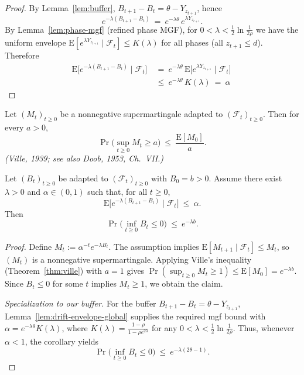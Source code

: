 \documentclass[lettersize,journal]{IEEEtran}
\newcommand{\EE}{\text{E}}
\begin{document}
\begin{proof}
	By Lemma~\ref{lem:buffer}, $B_{t+1}-B_t=\theta-Y_{z_{t+1}}$, hence
	\[
	e^{-\lambda(B_{t+1}-B_t)}\ =\ e^{-\lambda\theta}\,e^{\lambda Y_{z_{t+1}}}.
	\]
	By Lemma~\ref{lem:phase-mgf} (refined phase MGF), for $0<\lambda<\tfrac12\ln\!\tfrac{1}{2\rho}$ we have the uniform envelope
	$\EE[e^{\lambda Y_{z_{t+1}}}\mid\mathcal F_t]\le K(\lambda)$ for all phases (all $z_{t+1}\le d$). Therefore
	\begin{align*}
	\EE\!\big[e^{-\lambda(B_{t+1}-B_t)}\mid \mathcal F_t\big]
	\ &=\ e^{-\lambda\theta}\,\EE\!\big[e^{\lambda Y_{z_{t+1}}}\mid\mathcal F_t\big]
	\ \\ &\le\ e^{-\lambda\theta}\,K(\lambda)
	\ =\ \alpha	
	\end{align*}
\end{proof}
\begin{theorem}\label{thm:ville}
	Let $(M_t)_{t\ge 0}$ be a nonnegative supermartingale adapted to $(\mathcal F_t)_{t\ge 0}$. 
	Then for every $a>0$,
	\[
	\Pr\!\big(\sup_{t\ge 0} M_t \ge a\big)\ \le\ \frac{\EE[M_0]}{a}.
	\]
	\emph{(Ville, 1939; see also Doob, 1953, Ch.~VII.)}
\end{theorem}

\begin{corollary}\label{cor:ville-exponential}
	Let $(B_t)_{t\ge 0}$ be adapted to $(\mathcal F_t)_{t\ge 0}$ with $B_0=b>0$.
	Assume there exist $\lambda>0$ and $\alpha\in(0,1)$ such that, for all $t\ge 0$,
	\[
	\EE\!\big[e^{-\lambda(B_{t+1}-B_t)}\mid \mathcal F_t\big]\ \le\ \alpha.
	\]
	Then
	\[
	\Pr\!\big(\inf_{t\ge 0} B_t \le 0\big)\ \le\ e^{-\lambda b}.
	\]
\end{corollary}

\begin{proof}
	Define $M_t:=\alpha^{-t}e^{-\lambda B_t}$. The assumption implies
	$\EE[M_{t+1}\mid\mathcal F_t]\le M_t$, so $(M_t)$ is a nonnegative supermartingale.
	Applying Ville’s inequality (Theorem~\ref{thm:ville}) with $a=1$ gives
	$\Pr(\sup_{t\ge 0} M_t\ge 1)\le \EE[M_0]=e^{-\lambda b}$.
	Since $B_t\le 0$ for some $t$ implies $M_t\ge 1$, we obtain the claim.
	
	\emph{Specialization to our buffer.}
	For the buffer $B_{t+1}-B_t=\theta-Y_{z_{t+1}}$, Lemma~\ref{lem:drift-envelope-global} supplies the required
	mgf bound with $\alpha=e^{-\lambda\theta}K(\lambda)$, where
	$K(\lambda)=\frac{1-\rho}{1-\rho e^{2\lambda}}$ for any $0<\lambda<\tfrac12\ln\!\tfrac{1}{2\rho}$.
	Thus, whenever $\alpha<1$, the corollary yields
	\[
	\Pr\!\big(\inf_{t\ge 0} B_t \le 0\big)\ \le\ e^{-\lambda(2\theta-1)}.
	\]
\end{proof}
\end{document}
